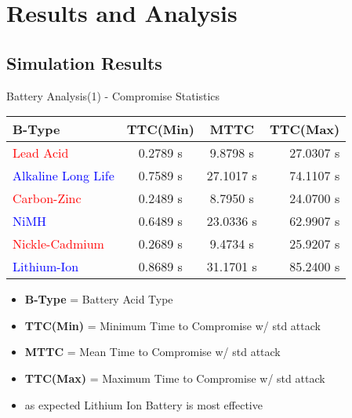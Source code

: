 \documentclass{beamer}
\begin{document}
\section{Results and Analysis}

\subsection{Simulation Results}

	\begin{frame}{Battery Analysis(1) - Compromise Statistics}
	\centering
		\begin{tabular}{| l | c | c | r |}
			\hline
			\textbf{B-Type} & \textbf{TTC(Min)}& \textbf{MTTC} & \textbf{TTC(Max)} \\
			\hline
			\hline
			\textcolor{red}{Lead Acid} & 0.2789 s & 9.8798 s & 27.0307 s \\
			\hline
			\textcolor{blue}{Alkaline Long Life} & 0.7589 s & 27.1017 s & 74.1107 s \\
			\hline
			\textcolor{red}{Carbon-Zinc} &  0.2489 s & 8.7950 s & 24.0700 s \\
			\hline
			\textcolor{blue}{NiMH} & 0.6489 s & 23.0336 s & 62.9907 s \\
			\hline
			\textcolor{red}{Nickle-Cadmium} & 0.2689 s & 9.4734 s & 25.9207 s \\
			\hline
			\textcolor{blue}{Lithium-Ion} & 0.8689 s & 31.1701 s & 85.2400 s \\
			\hline
		\end{tabular}
		\begin{itemize}
			\item \textbf{B-Type} = Battery Acid Type
			\item \textbf{TTC(Min)} = Minimum Time to Compromise w/ std attack
			\item \textbf{MTTC} = Mean Time to Compromise w/ std attack
			\item \textbf{TTC(Max)} = Maximum Time to Compromise w/ std attack
			\item as expected Lithium Ion Battery is most effective
		\end{itemize}
	\end{frame}
	
\end{document}
